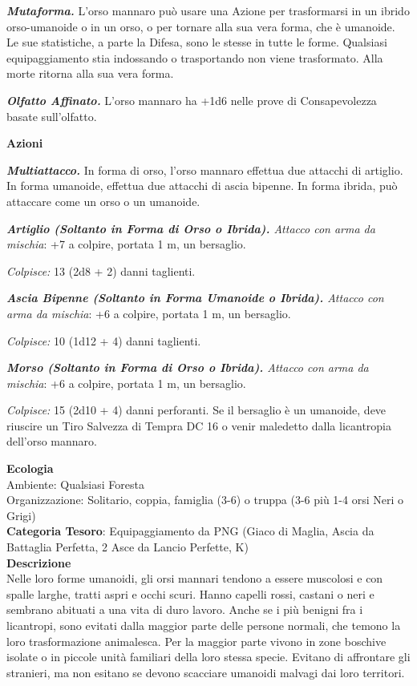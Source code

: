 \begin{multicols}{2}
{\emph{\textbf{Mutaforma.}} L'orso mannaro può usare una Azione per trasformarsi in un ibrido orso-umanoide o in un orso, o per tornare alla sua vera forma, che è umanoide. Le sue statistiche, a parte la Difesa, sono le stesse in tutte le forme. Qualsiasi equipaggiamento stia indossando o trasportando non viene trasformato. Alla morte ritorna alla sua vera forma.

\emph{\textbf{Olfatto Affinato.}} L'orso mannaro ha +1d6 nelle prove di Consapevolezza basate sull'olfatto.

\textbf{Azioni}

\emph{\textbf{Multiattacco.}} In forma di orso, l'orso mannaro effettua due attacchi di artiglio. In forma umanoide, effettua due attacchi di ascia bipenne. In forma ibrida, può attaccare come un orso o un umanoide.

\emph{\textbf{Artiglio (Soltanto in Forma di Orso o Ibrida).} Attacco con arma da mischia}: +7 a colpire, portata 1 m, un bersaglio.

\emph{Colpisce:} 13 (2d8 + 2) danni taglienti.

\emph{\textbf{Ascia Bipenne (Soltanto in Forma Umanoide o Ibrida).} Attacco con arma da mischia}: +6 a colpire, portata 1 m, un bersaglio.

\emph{Colpisce:} 10 (1d12 + 4) danni taglienti.

\emph{\textbf{Morso (Soltanto in Forma di Orso o Ibrida).} Attacco con arma da mischia}: +6 a colpire, portata 1 m, un bersaglio.

\emph{Colpisce:} 15 (2d10 + 4) danni perforanti. Se il bersaglio è un umanoide, deve riuscire un Tiro Salvezza di Tempra DC 16 o venir maledetto dalla licantropia dell'orso mannaro.

\textbf{Ecologia}\\
Ambiente: Qualsiasi Foresta\\
Organizzazione: Solitario, coppia, famiglia (3-6) o truppa (3-6 più 1-4 orsi Neri o Grigi)\\
\textbf{Categoria Tesoro}: Equipaggiamento da PNG (Giaco di Maglia, Ascia da Battaglia Perfetta, 2 Asce da Lancio Perfette, K)\\
\textbf{Descrizione}\\
Nelle loro forme umanoidi, gli orsi mannari tendono a essere muscolosi e con spalle larghe, tratti aspri e occhi scuri. Hanno capelli rossi, castani o neri e sembrano abituati a una vita di duro lavoro. Anche se i più benigni fra i licantropi, sono evitati dalla maggior parte delle persone normali, che temono la loro trasformazione animalesca. Per la maggior parte vivono in zone boschive isolate o in piccole unità familiari della loro stessa specie. Evitano di affrontare gli stranieri, ma non esitano se devono scacciare umanoidi malvagi dai loro territori.

}
\end{multicols}
